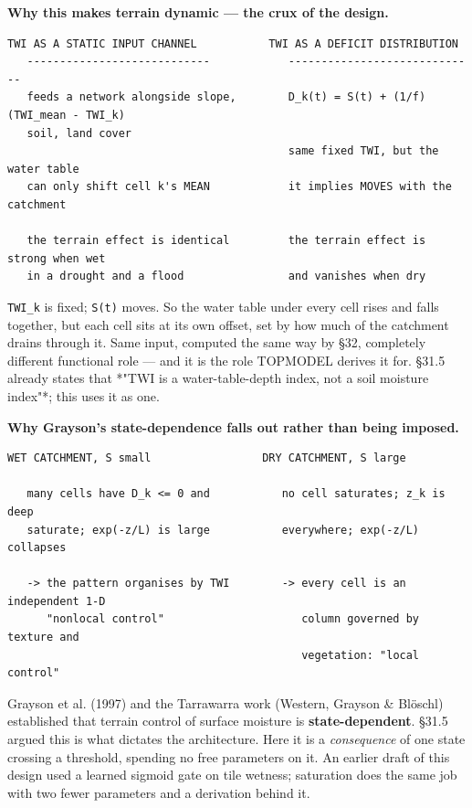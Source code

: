 \documentclass[10pt,a4paper]{article}
\begin{document}
\textbf{Why this makes terrain dynamic — the crux of the design.}

\begin{Verbatim}[fontsize=\scriptsize,frame=leftline,framerule=0.6pt,rulecolor=\color{rulegray},xleftmargin=6pt,framesep=6pt,]
   TWI AS A STATIC INPUT CHANNEL           TWI AS A DEFICIT DISTRIBUTION
   ----------------------------            -----------------------------
   feeds a network alongside slope,        D_k(t) = S(t) + (1/f)(TWI_mean - TWI_k)
   soil, land cover
                                           same fixed TWI, but the water table
   can only shift cell k's MEAN            it implies MOVES with the catchment

   the terrain effect is identical         the terrain effect is strong when wet
   in a drought and a flood                and vanishes when dry
\end{Verbatim}

\texttt{TWI\_k} is fixed; \texttt{S(t)} moves. So the water table under every cell rises and
falls together, but each cell sits at its own offset, set by how much of the
catchment drains through it. Same input, computed the same way by §32,
completely different functional role — and it is the role TOPMODEL derives it
for. §31.5 already states that *"TWI is a water-table-depth index, not a soil
moisture index"*; this uses it as one.

\textbf{Why Grayson's state-dependence falls out rather than being imposed.}

\begin{Verbatim}[fontsize=\scriptsize,frame=leftline,framerule=0.6pt,rulecolor=\color{rulegray},xleftmargin=6pt,framesep=6pt,]
   WET CATCHMENT, S small                 DRY CATCHMENT, S large

   many cells have D_k <= 0 and           no cell saturates; z_k is deep
   saturate; exp(-z/L) is large           everywhere; exp(-z/L) collapses

   -> the pattern organises by TWI        -> every cell is an independent 1-D
      "nonlocal control"                     column governed by texture and
                                             vegetation: "local control"
\end{Verbatim}

Grayson et al. (1997) and the Tarrawarra work (Western, Grayson \& Blöschl)
established that terrain control of surface moisture is \textbf{state-dependent}.
§31.5 argued this is what dictates the architecture. Here it is a \emph{consequence}
of one state crossing a threshold, spending no free parameters on it. An earlier
draft of this design used a learned sigmoid gate on tile wetness; saturation
does the same job with two fewer parameters and a derivation behind it.
\end{document}
